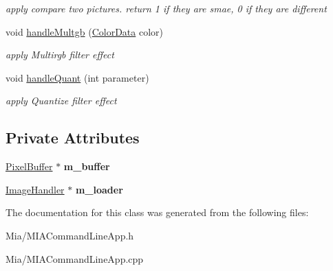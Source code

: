 \begin{DoxyCompactItemize}
\begin{DoxyCompactList}\small\item\em apply compare two pictures. return 1 if they are smae, 0 if they are different \end{DoxyCompactList}\item 
void \hyperlink{classMIACommandLineApp_ab3837792e96c27534b0290e7b7bdd5cc}{handle\+Multgb} (\hyperlink{classColorData}{Color\+Data} color)\hypertarget{classMIACommandLineApp_ab3837792e96c27534b0290e7b7bdd5cc}{}\label{classMIACommandLineApp_ab3837792e96c27534b0290e7b7bdd5cc}

\begin{DoxyCompactList}\small\item\em apply Multirgb filter effect \end{DoxyCompactList}\item 
void \hyperlink{classMIACommandLineApp_a7dd611671ab000d8c7975d4b9b2f125b}{handle\+Quant} (int parameter)\hypertarget{classMIACommandLineApp_a7dd611671ab000d8c7975d4b9b2f125b}{}\label{classMIACommandLineApp_a7dd611671ab000d8c7975d4b9b2f125b}

\begin{DoxyCompactList}\small\item\em apply Quantize filter effect \end{DoxyCompactList}\end{DoxyCompactItemize}
\subsection*{Private Attributes}
\begin{DoxyCompactItemize}
\item 
\hyperlink{classPixelBuffer}{Pixel\+Buffer} $\ast$ {\bfseries m\+\_\+buffer}\hypertarget{classMIACommandLineApp_ab0b3fcdb2414478c081d4713f99863c5}{}\label{classMIACommandLineApp_ab0b3fcdb2414478c081d4713f99863c5}

\item 
\hyperlink{classImageHandler}{Image\+Handler} $\ast$ {\bfseries m\+\_\+loader}\hypertarget{classMIACommandLineApp_a193cb889437a249d9517fea6c4ba8140}{}\label{classMIACommandLineApp_a193cb889437a249d9517fea6c4ba8140}

\end{DoxyCompactItemize}


The documentation for this class was generated from the following files\+:\begin{DoxyCompactItemize}
\item 
Mia/M\+I\+A\+Command\+Line\+App.\+h\item 
Mia/M\+I\+A\+Command\+Line\+App.\+cpp\end{DoxyCompactItemize}
